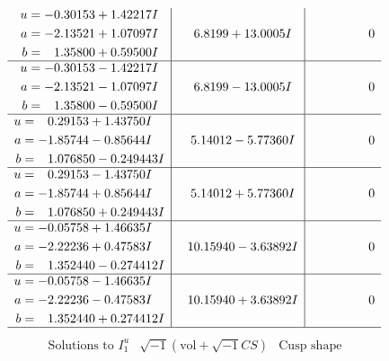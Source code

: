 \documentclass[1p]{elsarticle_modified}
\theoremstyle{definition}
\newcommand{\I}{\sqrt{-1}}
\begin{document}
$$\begin{array}{c|c|c}
\begin{aligned}
u &= -0.30153 + 1.42217 I \\
a &= -2.13521 + 1.07097 I \\
b &= \phantom{-}1.35800 + 0.59500 I\end{aligned}
 & \phantom{-}6.8199 + 13.0005 I & \phantom{-0.000000 } 0 \\ \hline\begin{aligned}
u &= -0.30153 - 1.42217 I \\
a &= -2.13521 - 1.07097 I \\
b &= \phantom{-}1.35800 - 0.59500 I\end{aligned}
 & \phantom{-}6.8199 - 13.0005 I & \phantom{-0.000000 } 0 \\ \hline\begin{aligned}
u &= \phantom{-}0.29153 + 1.43750 I \\
a &= -1.85744 - 0.85644 I \\
b &= \phantom{-}1.076850 - 0.249443 I\end{aligned}
 & \phantom{-}5.14012 - 5.77360 I & \phantom{-0.000000 } 0 \\ \hline\begin{aligned}
u &= \phantom{-}0.29153 - 1.43750 I \\
a &= -1.85744 + 0.85644 I \\
b &= \phantom{-}1.076850 + 0.249443 I\end{aligned}
 & \phantom{-}5.14012 + 5.77360 I & \phantom{-0.000000 } 0 \\ \hline\begin{aligned}
u &= -0.05758 + 1.46635 I \\
a &= -2.22236 + 0.47583 I \\
b &= \phantom{-}1.352440 - 0.274412 I\end{aligned}
 & \phantom{-}10.15940 - 3.63892 I & \phantom{-0.000000 } 0 \\ \hline\begin{aligned}
u &= -0.05758 - 1.46635 I \\
a &= -2.22236 - 0.47583 I \\
b &= \phantom{-}1.352440 + 0.274412 I\end{aligned}
 & \phantom{-}10.15940 + 3.63892 I & \phantom{-0.000000 } 0\\
 \hline 
 \end{array}$$\newpage$$\begin{array}{c|c|c}  
\text{Solutions to }I^u_{1}& \I (\text{vol} + \sqrt{-1}CS) & \text{Cusp shape}\\
 \hline 
\begin{aligned}

\end{aligned}
\end{array}$$
\end{document}
